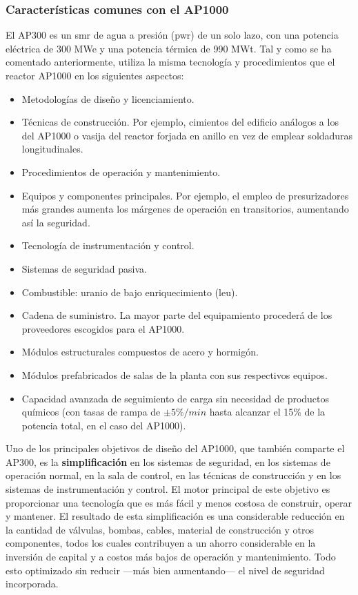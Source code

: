 \subsubsection{Características comunes con el AP1000}

El AP300 es un \acrshort{smr} de agua a presión (\acrshort{pwr}) de un solo lazo, con una potencia eléctrica de 300 MWe y una potencia térmica de 990 MWt. Tal y como se ha comentado anteriormente, utiliza la misma tecnología y procedimientos que el reactor AP1000 en los siguientes aspectos: 

\begin{itemize}
  \item Metodologías de diseño y licenciamiento.
  \item Técnicas de construcción. Por ejemplo, cimientos del edificio análogos a los del AP1000 o vasija del reactor forjada en anillo en vez de emplear soldaduras longitudinales.
  \item Procedimientos de operación y mantenimiento.
  \item Equipos y componentes principales. Por ejemplo, el empleo de presurizadores más grandes aumenta los márgenes de operación en transitorios, aumentando así la seguridad.
  \item Tecnología de instrumentación y control.
  \item Sistemas de seguridad pasiva.
  \item Combustible: uranio de bajo enriquecimiento (\acrshort{leu}).
  \item Cadena de suministro. La mayor parte del equipamiento procederá de los proveedores escogidos para el AP1000.
  \item Módulos estructurales compuestos de acero y hormigón.
  \item Módulos prefabricados de salas de la planta con sus respectivos equipos.
  \item Capacidad avanzada de seguimiento de carga sin necesidad de productos químicos (con tasas de rampa de $\pm5\%/min$ hasta alcanzar el 15\% de la potencia total, en el caso del AP1000).
\end{itemize}
Uno de los principales objetivos de diseño del AP1000, que también comparte el AP300, es la \textbf{simplificación} en los sistemas de seguridad, en los sistemas de operación normal, en la sala de control, en las técnicas de construcción y en los sistemas de instrumentación y control. El motor principal de este objetivo es proporcionar una tecnología que es más fácil y menos costosa de construir, operar y mantener. El resultado de esta simplificación es una considerable reducción en la cantidad de válvulas, bombas, cables, material de construcción y otros componentes, todos los cuales contribuyen a un ahorro considerable en la inversión de capital y a costos más bajos de operación y mantenimiento. Todo esto optimizado sin reducir ---más bien aumentando--- el nivel de seguridad incorporada.

